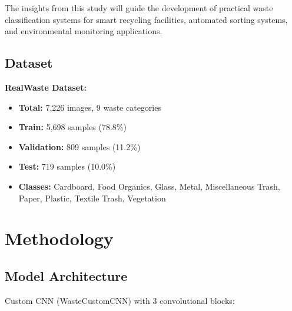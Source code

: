 \documentclass[12pt,a4paper]{article}
\begin{document}
The insights from this study will guide the development of practical waste classification systems for smart recycling facilities, automated sorting systems, and environmental monitoring applications.

\subsection{Dataset}

\textbf{RealWaste Dataset:}
\begin{itemize}
    \item \textbf{Total:} 7,226 images, 9 waste categories
    \item \textbf{Train:} 5,698 samples (78.8\%)
    \item \textbf{Validation:} 809 samples (11.2\%)  
    \item \textbf{Test:} 719 samples (10.0\%)
    \item \textbf{Classes:} Cardboard, Food Organics, Glass, Metal, Miscellaneous Trash, Paper, Plastic, Textile Trash, Vegetation
\end{itemize}

\section{Methodology}

\subsection{Model Architecture}

Custom CNN (WasteCustomCNN) with 3 convolutional blocks:
\end{document}
